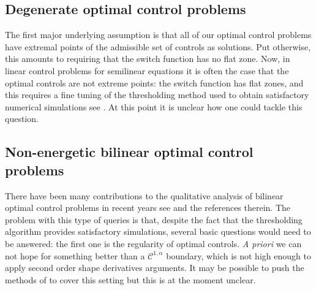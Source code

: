 \documentclass{article}
\numberwithin{equation}{section}
\begin{document}
\subsection{Degenerate optimal control problems}
The first major underlying assumption is that all of our optimal control problems have extremal points of the admissible set of controls as solutions. Put otherwise, this amounts to requiring that the switch function has no flat zone. Now, in linear control problems for semilinear equations it is often the case that the optimal controls are not extreme points: the switch function has flat zones, and this requires a fine tuning of the thresholding method used to obtain satisfactory numerical simulations see \cite{Nadin_2020}. At this point it is unclear how one could tackle this question.

\subsection{Non-energetic bilinear optimal control problems}
There have been many contributions to the qualitative analysis of bilinear optimal control problems in recent years see \cite{MNP2021} and the references therein. The problem with this type of queries is that, despite the fact that the thresholding algorithm provides satisfactory simulations, several basic questions would need to be answered: the first one is the regularity of optimal controls. \emph{A priori} we can not hope for something better than a $\mathscr C^{1,\alpha}$ boundary, which is not high enough to apply second order shape derivatives arguments. It may be possible to push the methods of \cite{Chanillo_2000} to cover this setting but this is at the moment unclear.



%



\end{document}
